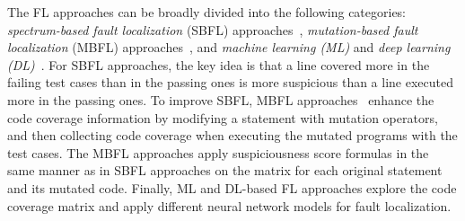 The FL approaches can be broadly divided into the following
categories: {\em spectrum-based fault localization} (SBFL)
approaches~\cite{abreu2006evaluation,jones2001visualization,keller2017critical},
{\em mutation-based fault localization} (MBFL)
approaches~\cite{MUSE,papadakis2012using,Metallaxis}, and {\em machine
  learning (ML)} and {\em deep learning (DL)}~\cite{DeepFL,icse21-fl}.
For SBFL approaches, the key idea is that a line covered more in the
failing test cases than in the passing ones is more suspicious than a
line executed more in the passing ones. To improve SBFL, MBFL
approaches~\cite{MUSE,papadakis2012using,Metallaxis} enhance the code
coverage information by modifying a statement with mutation operators,
and then collecting code coverage when executing the mutated programs
with the test cases. The MBFL approaches apply suspiciousness score
formulas in the same manner as in SBFL approaches on the matrix for
each original statement and its mutated code. Finally, ML and
DL-based FL approaches explore the code coverage matrix and apply
different neural network models for fault localization.




